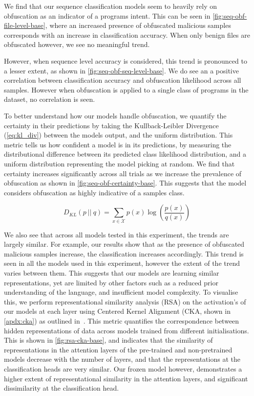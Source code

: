 \documentclass[main.tex]{subfiles}
\begin{document}
We find that our sequence classification models seem to heavily rely on obfuscation as an indicator of a programs intent. This can be seen in \cref{fig:seq-obf-file-level-base}, where an increased presence of obfuscated malicious samples corresponds with an increase in classification accuracy. When only benign files are obfuscated however, we see no meaningful trend. 


However, when sequence level accuracy is considered, this trend is pronounced to a lesser extent, as shown in \cref{fig:seq-obf-seq-level-base}. We do see an a positive correlation between classification accuracy and obfuscation likelihood across all samples. However when obfuscation is applied to a single class of programs in the dataset, no correlation is seen. 

To better understand how our models handle obfuscation, we quantify the certainty in their predictions by taking the Kullback-Leibler Divergence (\cref{eq:kl_div}) between the models output, and the uniform distribution. This metric tells us how confident a model is in its predictions, by measuring the distributional difference between its predicted class likelihood distribution, and a uniform distribution representing the model picking at random. We find that certainty increases significantly across all trials as we increase the prevalence of obfuscation as shown in \cref{fig:seq-obf-certainty-base}. This suggests that the model considers obfuscation as highly indicative of a samples class. 

\begin{equation}
    D_{KL}\left(p~||~q\right) = \sum_{x \in \mathcal{X}} p\left(x\right) \log \left(\frac{p\left(x\right)}{q\left(x\right)}\right)\label{eq:kl_div}
\end{equation}

We also see that across all models tested in this experiment, the trends are largely similar. For example, our results show that as the presence of obfuscated malicious samples increase, the classification increases accordingly. This trend is seen in all the models used in this experiment, however the extent of the trend varies between them. This suggests that our models are learning similar representations, yet are limited by other factors such as a reduced prior understanding of the language, and insufficient model complexity. To visualise this, we perform representational similarity analysis (RSA) on the activation's of our models at each layer using Centered Kernel Alignment (CKA, shown in \cref{apdx:cka}) as outlined in~\citep{kornblithSimilarityNeuralNetwork2019}. This metric quantifies the correspondence between hidden representations of data across models trained from different initialisations. This is shown in \cref{fig:rsa-cka-base}, and indicates that the similarity of representations in the attention layers of the pre-trained and non-pretrained models decrease with the number of layers, and that the representations at the classification heads are very similar. Our frozen model however, demonstrates a higher extent of representational similarity in the attention layers, and significant dissimilarity at the classification head. 
\end{document}

